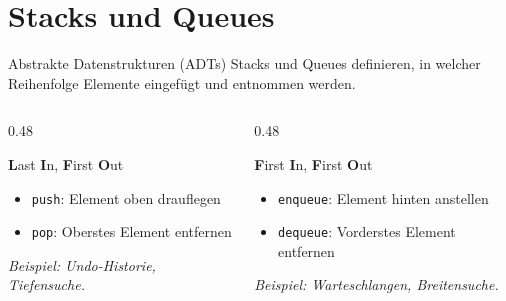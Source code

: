 \documentclass[aspectratio=169,11pt]{beamer}
\begin{document}
\section{Stacks und Queues}

\begin{frame}{Abstrakte Datenstrukturen (ADTs)}
    Stacks und Queues definieren, in welcher Reihenfolge Elemente eingefügt und entnommen werden.
    
    \begin{columns}[T]
        \begin{column}{0.48\textwidth}
            \begin{tcolorbox}[modernbox, title=\faLayerGroup\ Stack (LIFO)]
                \textbf{L}ast \textbf{I}n, \textbf{F}irst \textbf{O}ut
                \begin{itemize}
                    \item \texttt{push}: Element oben drauflegen
                    \item \texttt{pop}: Oberstes Element entfernen
                \end{itemize}
                \textit{Beispiel: Undo-Historie, Tiefensuche.}
            \end{tcolorbox}
        \end{column}
        \begin{column}{0.48\textwidth}
            \begin{tcolorbox}[modernbox, title=\faUsers\ Queue (FIFO)]
                \textbf{F}irst \textbf{I}n, \textbf{F}irst \textbf{O}ut
                \begin{itemize}
                    \item \texttt{enqueue}: Element hinten anstellen
                    \item \texttt{dequeue}: Vorderstes Element entfernen
                \end{itemize}
                \textit{Beispiel: Warteschlangen, Breitensuche.}
            \end{tcolorbox}
        \end{column}
    \end{columns}
\end{frame}
\end{document}
